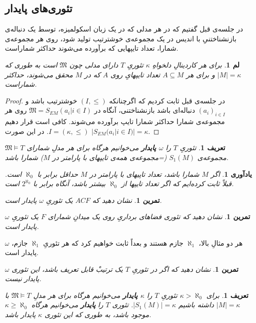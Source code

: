 \documentclass[12pt,a4paper]{report}
\theoremstyle{colorhead}
\newtheorem{tam}[thm]{تمرین}
\newtheorem{defn}[thm]{تعریف}
\newtheorem{yad}[thm]{یادآوری}
\newtheorem{lem}[thm]{لم}
\begin{document}
\subsection{تئوری‌های پایدار}
در جلسه‌ی قبل گفتیم که در هر مدلی
که 
در یک زبان اسکولمیزه، توسط یک دنباله‌ی بازنشناختنیِ با اندیس در یک
مجموعه‌ی خوشترتیب تولید شود، 
روی هر مجموعه‌ی شمارا، تعداد تایپهایی که برآورده می‌شوند
حداکثر شماراست.
\begin{lem}
\label{shomaratype}
برای هر کاردینالِ دلخواهِ
$\kappa$
تئوریِ
$T$
دارای مدلی چون
$\mathfrak{M}$
است به طوری که 
$|M|=\kappa$
و برای هر
$A\subseteq M$
تعداد تایپهایِ روی
$A$
که در
$M$
محقق می‌شوند،‌ حداکثر شماراست. 
\end{lem}
\begin{proof}
در جلسه‌ی قبل ثابت کردیم که اگرچنانکه
$(I,\leq)$
خوشترتیب باشد و
$(a_i)_{i\in I}$
دنباله‌ای باشد بازنشناختنی، آنگاه در
$\mathfrak{M}=S_{EM}(a_i|i\in I)$
روی هر مجموعه‌ی شمارا حداکثر شمارا تایپ برآورده می‌شوند. کافی است قرار دهیم
$I=(\kappa,\leq)$.
در این صورت
\mbox{$|S_{EM}(a_i|i\in I)|=\kappa$}.
\end{proof}
\begin{defn}
تئوریِ
$T$
را
\textbf{$\omega$
پایدار}
 می‌خوانیم هرگاه برای هر مدلِ شمارای
$\mathfrak{M}\models T$
مجموعه‌ی
$S_1(M)$
(=مجموعه‌ی همه‌ی تایپهای با پارامتر در
$M$)
شمارا باشد. 
\end{defn}
\begin{yad}
اگر
$M$
شمارا باشد،
تعداد تاپیهای با پارامتر در
$M$
حداقل برابر 	 با
$\aleph_0$
است.
 قبلاً ثابت کرده‌ایم که اگر تعداد تایپها از
$\aleph_0$
بیشتر باشد، آنگاه برابر با
$2^{\aleph_0}$
است. 
\end{yad}
\begin{tam}
نشان دهید که
$ACF$
یک تئوریِ
$\omega$
پایدار است. 
\end{tam}
\begin{tam}
نشان دهید که تئوری فضاهای برداریِ روی یک میدانِ شمارای
$F$
یک تئوریِ
$\omega$
پایدار است. 
\end{tam}
هر دو مثالِ بالا،
$\aleph_1$
جازم هستند و بعداً ‌ثابت خواهیم کرد که هر تئوریِ
$\aleph_1$
جازم،
$\omega$
پایدار است.
\begin{tam}
نشان دهید که اگر در تئوریِ
$T$
یک
ترتیبْ قابل تعریف باشد، این تئوری
$\omega$
پایدار نیست.
\end{tam}
\begin{defn}
برای
$\kappa>\aleph_0$
تئوریِ
$T$
را
\textbf{$\kappa$
پایدار}
می‌خوانیم هرگاه  برای هر مدلِ
$\mathfrak{M}\models T$
با
$|M|=\kappa$
داشته باشیم
$|S_1(M)|=\kappa$.
تئوری
$T$
را 
\textbf{پایدار }
می‌خوانیم هرگاه
$\kappa\geq \aleph_0$
موجود باشد، به طوری که این تئوری
$\kappa$
پایدار باشد. 
\end{defn}
\end{document}
